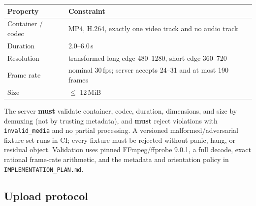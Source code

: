 \documentclass[11pt]{article}
\newcommand{\code}[1]{\texttt{#1}}
\begin{document}
\begin{center}
\begin{tabular}{@{}ll@{}}
\toprule
Property & Constraint \\
\midrule
Container / codec & MP4, H.264, exactly one video track and no audio track \\
Duration & 2.0--6.0\,s \\
Resolution & transformed long edge 480--1280, short edge 360--720 \\
Frame rate & nominal 30\,fps; server accepts 24--31 and at most 190 frames \\
Size & $\leq$ 12\,MiB \\
\bottomrule
\end{tabular}
\end{center}

The server \textbf{must} validate container, codec, duration, dimensions, and size
by demuxing (not by trusting metadata), and \textbf{must} reject violations with
\code{invalid\_media} and no partial processing. A versioned malformed/adversarial
fixture set runs in CI; every fixture must be rejected without panic, hang, or
residual object. Validation uses pinned FFmpeg/ffprobe 9.0.1, a full decode, exact
rational frame-rate arithmetic, and the metadata and orientation policy in
\code{IMPLEMENTATION\_PLAN.md}.

\subsection{Upload protocol}
\end{document}
